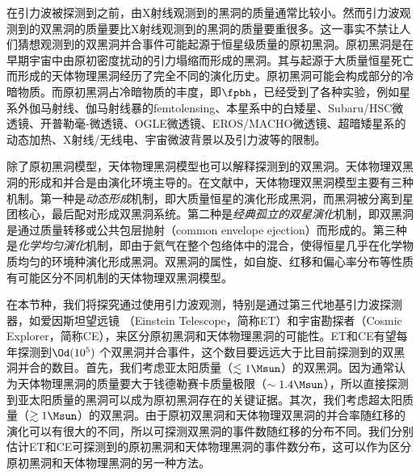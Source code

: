 在引力波被探测到之前，由X射线观测到的黑洞的质量通常比较小\cite{Wiktorowicz:2013dua,Casares:2013tpa,Corral-Santana:2013uua,Corral-Santana:2015fud}。然而引力波观测到的双黑洞的质量要比X射线观测到的黑洞的质量要重很多。这一事实不禁让人们猜想观测到的双黑洞并合事件可能起源于恒星级质量的原初黑洞\cite{Bird:2016dcv,Sasaki:2016jop,Chen:2018czv,Clesse:2017bsw}。原初黑洞是在早期宇宙中由原初密度扰动的引力塌缩而形成的黑洞\cite{Hawking:1971ei,Carr:1974nx,Khlopov:2008qy,Sasaki:2018dmp}。其与起源于大质量恒星死亡而形成的天体物理黑洞经历了完全不同的演化历史。原初黑洞可能会构成部分的冷暗物质。而原初黑洞占冷暗物质的丰度，即$\fpbh$，已经受到了各种实验，例如星系外伽马射线\cite{Carr:2009jm}、伽马射线暴的femtolensing\cite{Barnacka:2012bm}、本星系中的白矮星\cite{Graham:2015apa}、Subaru/HSC微透镜\cite{Niikura:2017zjd}、开普勒毫-微透镜\cite{Griest:2013esa}、OGLE微透镜\cite{Niikura:2019kqi}、EROS/MACHO微透镜\cite{Tisserand:2006zx,Calcino:2018mwh}、超暗矮星系的动态加热\cite{Brandt:2016aco}、X射线/无线电\cite{Gaggero:2016dpq}、宇宙微波背景\cite{Ali-Haimoud:2016mbv,Blum:2016cjs,Horowitz:2016lib,Chen:2016pud,Poulin:2017bwe}以及引力波\cite{Wang:2016ana,Abbott:2018oah,Authors:2019qbw,Magee:2018opb,Wang:2019kaf,Chen:2019xse,Yuan:2019udt,Chen:2018rzo}等的限制。

除了原初黑洞模型，天体物理黑洞模型也可以解释\lvc 探测到的双黑洞。天体物理双黑洞的形成和并合是由演化环境主导的。在文献中，天体物理双黑洞模型主要有三种机制。第一种是\textit{动态形成}机制，即大质量恒星的演化形成黑洞，而黑洞被分离到星团核心，最后配对形成双黑洞系统\cite{Rodriguez:2015oxa,Rodriguez:2016kxx,Park:2017zgj}。第二种是\textit{经典孤立的双星演化}机制，即双黑洞是通过质量转移或公共包层抛射（common envelope ejection）而形成的\cite{Belczynski:2014iua,Belczynski:2016obo,Woosley:2016nnw,Rodriguez:2018rmd,Choksi:2018jnq}。第三种是\textit{化学均匀演化}机制，即由于氦气在整个包络体中的混合\cite{2010AIPC.1314..291D,deMink:2016vkw}，使得恒星几乎在化学物质均匀的环境种演化形成黑洞。双黑洞的属性，如自旋\cite{Farr:2017uvj,Tiwari:2018qch,Ng:2018neg,Stevenson:2017dlk,Bogomazov:2018prw,Lopez:2018nkj,Sedda:2018nxm,Farr:2017gtv}、红移\cite{Fishbach:2018edt,Emami:2018taj,Bai:2018shq}和偏心率分布\cite{Samsing:2013kua,Samsing:2017xmd,Samsing:2017jnz,Lower:2018seu}等性质有可能区分不同机制的天体物理双黑洞模型。

在本节种，我们将探究通过使用引力波观测，特别是通过第三代地基引力波探测器，如爱因斯坦望远镜 （Einstein Telescope，简称ET）\cite{Punturo:2010zz}和宇宙勘探者（Cosmic Explorer，简称CE）\cite{Evans:2016mbw}，来区分原初黑洞和天体物理黑洞的可能性。ET和CE有望每年探测到$\Od(10^5)$ \cite{Regimbau:2016ike,Vitale:2018yhm}个双黑洞并合事件，这个数目要远远大于比目前\lvc 探测到的双黑洞并合的数目。首先，我们考虑亚太阳质量（$\lesssim 1\Msun$）的双黑洞。因为通常认为天体物理黑洞的质量要大于钱德勒赛卡质量极限（$\sim 1.4 \Msun$）\cite{Chandrasekhar:1931ftj,Chandrasekhar:1931ih}，所以直接探测到亚太阳质量的黑洞可以成为原初黑洞存在的关键证据。其次，我们考虑超太阳质量（$\gtrsim 1\Msun$）的双黑洞。由于原初双黑洞和天体物理双黑洞的并合率随红移的演化可以有很大的不同，所以可探测双黑洞的事件数随红移的分布不同。我们分别估计ET和CE可探测到的原初黑洞和天体物理黑洞的事件数分布，这可以作为区分原初黑洞和天体物理黑洞的另一种方法。


